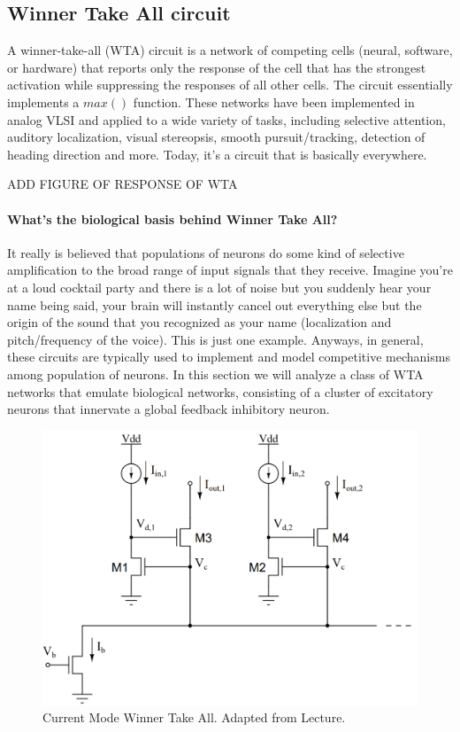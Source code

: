 \subsection{Winner Take All circuit}

A winner-take-all (WTA) circuit is a network of competing cells (neural,
software, or hardware) that reports only the response of the cell that has the strongest activation while suppressing the responses of all other cells. The circuit essentially implements a $max()$ function. These networks have been implemented in analog VLSI and applied to a wide variety of tasks, including selective attention, auditory localization, visual stereopsis, smooth pursuit/tracking, detection of heading direction and more. Today, it's a circuit that is basically everywhere. 

ADD FIGURE OF RESPONSE OF WTA

\paragraph{What's the biological basis behind Winner Take All?} It really is believed that populations of neurons do some kind of selective amplification to the broad range of input signals that they receive. Imagine you're at a loud cocktail party and there is a lot of noise but you suddenly hear your name being said, your brain will instantly cancel out everything else but the origin of the sound that you recognized as your name (localization and pitch/frequency of the voice). This is just one example. Anyways, in general, these circuits are typically used to implement and model competitive mechanisms among population of neurons. In this section we will analyze a class of WTA networks that emulate biological networks, consisting of a cluster of excitatory neurons that innervate a global feedback inhibitory neuron.


\begin{figure}[H]
    \centering
    \includegraphics[width=0.6\linewidth]{../../Figures/Current_Mode_WTA.PNG}
    \caption{Current Mode Winner Take All. Adapted from Lecture.}
    \label{fig:Winner_Take_All}
\end{figure}


